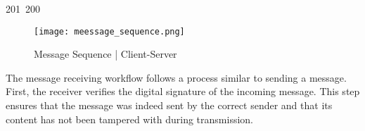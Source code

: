 201~200~\documentclass{article}
\begin{document}
	                                                                                                                                                                                                                                                                                                	                                                                                \begin{figure}[ht]
	                                                                                                                                                                                                                                                                                                	                                                                                    \centering
	                                                                                                                                                                                                                                                                                                	                                                                                        \texttt{[image: meessage\_sequence.png]}
	                                                                                                                                                                                                                                                                                                	                                                                                            \caption{Message Sequence | Client-Server}
	                                                                                                                                                                                                                                                                                                	                                                                                                \label{fig:enter-label}
	                                                                                                                                                                                                                                                                                                	                                                                                                \end{figure}

	                                                                                                                                                                                                                                                                                                	                                                                                                The message receiving workflow follows a process similar to sending a message. First, the receiver verifies the digital signature of the incoming message. This step ensures that the message was indeed sent by the correct sender and that its content has not been tampered with during transmission.
\end{document}

